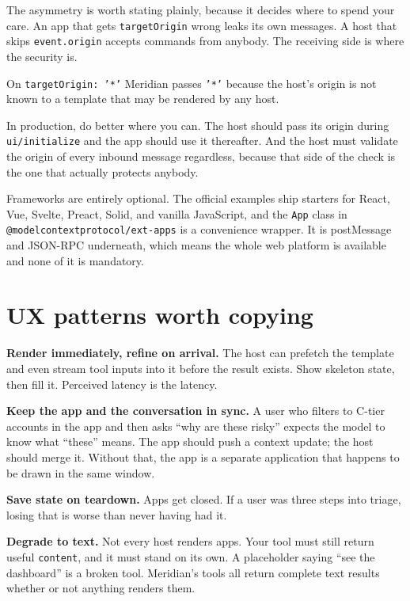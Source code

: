 The asymmetry is worth stating plainly, because it decides where to spend your
care. An app that gets \texttt{targetOrigin} wrong leaks its own messages. A
host that skips \texttt{event.origin} accepts commands from anybody. The
receiving side is where the security is.

\begin{notebox}{On \texttt{targetOrigin: '*'}}
Meridian passes \texttt{'*'} because the host's origin is not known to a
template that may be rendered by any host.

In production, do better where you can. The host should pass its origin during
\texttt{ui/initialize} and the app should use it thereafter. And the host must
validate the origin of every inbound message regardless, because that side of
the check is the one that actually protects anybody.
\end{notebox}

Frameworks are entirely optional. The official examples ship starters for React,
Vue, Svelte, Preact, Solid, and vanilla JavaScript, and the \texttt{App} class
in \texttt{@modelcontextprotocol/ext-apps} is a convenience wrapper. It is postMessage and JSON-RPC underneath, which means the whole
web platform is available and none of it is mandatory.

\section{UX patterns worth copying}

\textbf{Render immediately, refine on arrival.} The host can prefetch the
template and even stream tool inputs into it before the result exists. Show
skeleton state, then fill it. Perceived latency is the latency.

\textbf{Keep the app and the conversation in sync.} A user who filters to C-tier
accounts in the app and then asks ``why are these risky'' expects the model to
know what ``these'' means. The app should push a context update; the host should
merge it. Without that, the app is a separate application that happens to be
drawn in the same window.

\textbf{Save state on teardown.} Apps get closed. If a user was three steps into
triage, losing that is worse than never having had it.

\textbf{Degrade to text.} Not every host renders apps. Your tool must still
return useful \texttt{content}, and it must stand on its own. A placeholder saying ``see the dashboard'' is a
broken tool. Meridian's tools all return complete
text results whether or not anything renders them.

